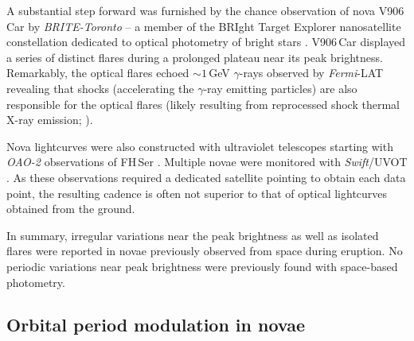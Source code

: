 \documentclass[twocolumn]{aastex631}
\begin{document}
A substantial step forward was furnished by the chance observation of nova V906\,Car by 
{\em BRITE-Toronto} -- a member of the BRIght Target Explorer nanosatellite constellation
dedicated to optical photometry of bright stars \citep{2016PASP..128l5001P}.
V906\,Car displayed a series of distinct flares during a prolonged plateau near its peak
brightness. Remarkably, the optical flares echoed $\sim 1$\,GeV $\gamma$-rays
observed by {\em Fermi}-LAT \citep{2009ApJ...697.1071A} revealing that shocks (accelerating the $\gamma$-ray
emitting particles) are also responsible for the optical flares (likely
resulting from reprocessed shock thermal X-ray emission;
\citep{2020NatAs...4..776A}).

Nova lightcurves were also constructed with ultraviolet telescopes 
starting with {\em OAO-2} observations of FH\,Ser \citep{1974ApJ...189..303G}.
Multiple novae were monitored with {\em Swift}/UVOT \citep{2022Univ....8..643P}. 
As these observations required a dedicated satellite pointing to
obtain each data point, the resulting cadence is often not superior to  
that of optical lightcurves obtained from the ground.

In summary, irregular variations near the peak brightness as well as isolated 
flares were reported in novae previously observed from space during eruption.
No periodic variations near peak brightness were previously found with space-based photometry.



\subsection{Orbital period modulation in novae}
\label{sec:orbitalmodulationnovae}
\end{document}
